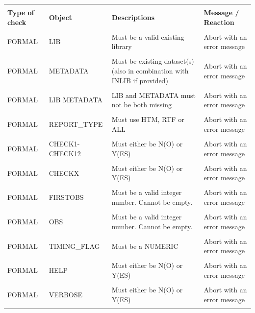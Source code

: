 \documentclass[
  letterpaper,
  DIV=11,
  numbers=noendperiod]{scrartcl}
\begin{document}
\begin{longtable}[]{@{}
  >{\raggedright\arraybackslash}p{}
  >{\raggedright\arraybackslash}p{}
  >{\raggedright\arraybackslash}p{}
  >{\raggedright\arraybackslash}p{}@{}}
\toprule\noalign{}
\endhead
\bottomrule\noalign{}
\endlastfoot
& & & \\
\textbf{Type of check} & \textbf{Object} & \textbf{Descriptions} &
\textbf{Message / Reaction} \\
& & & \\
FORMAL & LIB & Must be a valid existing library & Abort with an error
message \\
& & & \\
FORMAL & METADATA & Must be existing dataset(s) (also in combination
with INLIB if provided) & Abort with an error message \\
& & & \\
FORMAL & LIB METADATA & LIB and METADATA must not be both missing &
Abort with an error message \\
& & & \\
FORMAL & REPORT\_TYPE & Must use HTM, RTF or ALL & Abort with an error
message \\
& & & \\
FORMAL & CHECK1-CHECK12 & Must either be N(O) or Y(ES) & Abort with an
error message \\
& & & \\
FORMAL & CHECKX & Must either be N(O) or Y(ES) & Abort with an error
message \\
& & & \\
FORMAL & FIRSTOBS & Must be a valid integer number. Cannot be empty. &
Abort with an error message \\
& & & \\
FORMAL & OBS & Must be a valid integer number. Cannot be empty. & Abort
with an error message \\
& & & \\
FORMAL & TIMING\_FLAG & Must be a NUMERIC & Abort with an error
message \\
& & & \\
FORMAL & HELP & Must either be N(O) or Y(ES) & Abort with an error
message \\
& & & \\
FORMAL & VERBOSE & Must either be N(O) or Y(ES) & Abort with an error
message \\
& & & \\
\end{longtable}
\end{document}
